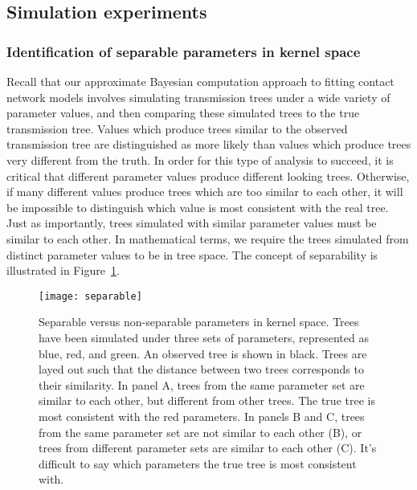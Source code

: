 \subsection{Simulation experiments}

\subsubsection{Identification of separable parameters in kernel space}
\label{subsubsec:kernel}

Recall that our approximate Bayesian computation approach to fitting contact
network models involves simulating transmission trees under a wide variety of
parameter values, and then comparing these simulated trees to the true
transmission tree. Values which produce trees similar to the observed
transmission tree are distinguished as more likely than values which produce
trees very different from the truth. In order for this type of analysis to
succeed, it is critical that different parameter values produce different
looking trees. Otherwise, if many different values produce trees which are too
similar to each other, it will be impossible to distinguish which value is most
consistent with the real tree. Just as importantly, trees simulated with
similar parameter values must be similar to each other. In mathematical terms,
we require the trees simulated from distinct parameter values to be
 in tree space. The concept of separability is illustrated in
Figure~\ref{fig:separable}.

\begin{figure}[ht]
  \centering
  \texttt{[image: separable]}
  \caption[Separable versus non-separable pararameters in kernel space]{
    Separable versus non-separable parameters in kernel space. Trees have been
    simulated under three sets of parameters, represented as blue, red, and
    green. An observed tree is shown in black. Trees are layed out such that
    the distance between two trees corresponds to their similarity. In panel A,
    trees from the same parameter set are similar to each other, but different
    from other trees. The true tree is most consistent with the red parameters.
    In panels B and C, trees from the same parameter set are not similar to
    each other (B), or trees from different parameter sets are similar to each
    other (C). It's difficult to say which parameters the true tree is most
    consistent with.
  }
  \label{fig:separable}
\end{figure}


